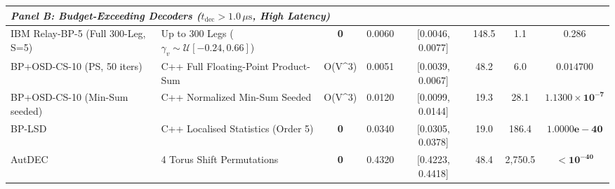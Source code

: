 \begin{table}[t]
\begin{tabular}{llcccccc}
\midrule
\multicolumn{8}{l}{\textit{\textbf{Panel B: Budget-Exceeding Decoders ($t_{\text{dec}} > 1.0\,\mu\text{s}$, High Latency)}}} \\
\midrule
IBM Relay-BP-5 (Full 300-Leg, S=5)~\cite{muller2025relay} & Up to 300 Legs ($\gamma_v \sim \mathcal{U}[-0.24, 0.66]$) & \textbf{0} & 0.0060 & [0.0046, 0.0077] & 148.5 & 1.1 & 0.286 \\
BP+OSD-CS-10 (PS, 50 iters)~\cite{roffe2020decoding} & C++ Full Floating-Point Product-Sum & O(V^3) & 0.0051 & [0.0039, 0.0067] & 48.2 & 6.0 & $\mathbf{0.014700}$ \\
BP+OSD-CS-10 (Min-Sum seeded)~\cite{roffe2020decoding} & C++ Normalized Min-Sum Seeded & O(V^3) & 0.0120 & [0.0099, 0.0144] & 19.3 & 28.1 & $\mathbf{1.1300\times 10^{-7}}$ \\
BP-LSD~\cite{higgott2024lsd} & C++ Localised Statistics (Order 5) & \textbf{0} & 0.0340 & [0.0305, 0.0378] & 19.0 & 186.4 & $\mathbf{1.0000e-40}$ \\
AutDEC~\cite{moradi2025autdec} & 4 Torus Shift Permutations & \textbf{0} & 0.4320 & [0.4223, 0.4418] & 48.4 & 2,750.5 & $\mathbf{< 10^{-40}}$ \\
\bottomrule
\end{tabular}
\end{table}
